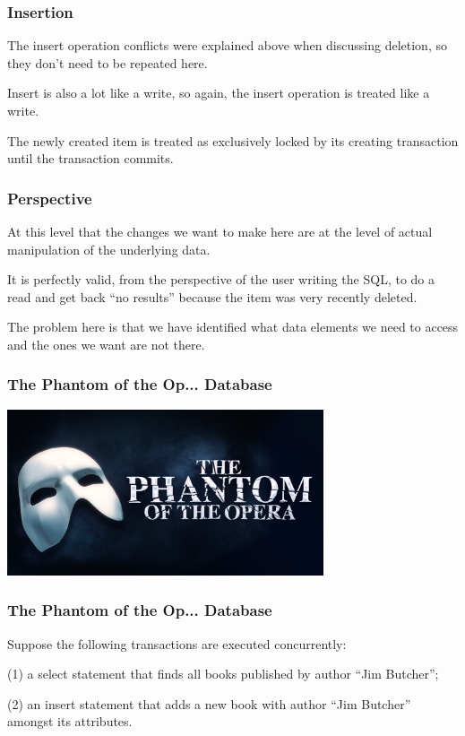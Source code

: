 \begin{frame}
\frametitle{Insertion}

The insert operation conflicts were explained above when discussing deletion, so they don't need to be repeated here. 

Insert is also a lot like a write, so again, the insert operation is treated like a write. 

The newly created item is treated as exclusively locked by its creating transaction until the transaction commits.

\end{frame}

\begin{frame}
\frametitle{Perspective}

At this level that the changes we want to make here are at the level of actual manipulation of the underlying data. 

It is perfectly valid, from the perspective of the user writing the SQL, to do a read and get back ``no results'' because the item was very recently deleted. 

The problem here is that we have identified what data elements we need to access and the ones we want are not there.

\end{frame}

\begin{frame}
\frametitle{The Phantom of the Op... Database}

\begin{center}
\includegraphics[width=0.7\textwidth]{images/phantom.png}
\end{center}


\end{frame}

\begin{frame}
\frametitle{The Phantom of the Op... Database}

Suppose the following transactions are executed concurrently: 

(1) a select statement that finds all books published by author ``Jim Butcher''; 

(2) an insert statement that adds a new book with author ``Jim Butcher'' amongst its attributes. 

\end{frame}


